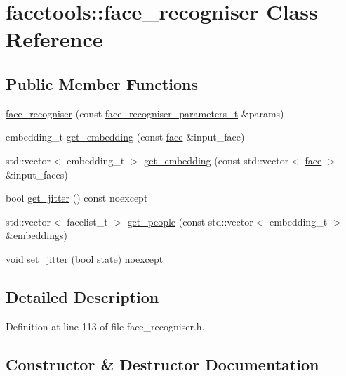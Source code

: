 \hypertarget{classfacetools_1_1face__recogniser}{}\section{facetools\+:\+:face\+\_\+recogniser Class Reference}
\label{classfacetools_1_1face__recogniser}
\subsection*{Public Member Functions}
\begin{DoxyCompactItemize}
\item 
\hyperlink{classfacetools_1_1face__recogniser_a4b091ff0164321ddadad92dd082c6639}{face\+\_\+recogniser} (const \hyperlink{structfacetools_1_1face__recogniser__parameters__t}{face\+\_\+recogniser\+\_\+parameters\+\_\+t} \&params)
\item 
embedding\+\_\+t \hyperlink{classfacetools_1_1face__recogniser_a9774f8e19f5ae4808efcc39cecc7ceb2}{get\+\_\+embedding} (const \hyperlink{structfacetools_1_1face}{face} \&input\+\_\+face)
\item 
std\+::vector$<$ embedding\+\_\+t $>$ \hyperlink{classfacetools_1_1face__recogniser_a8067f4dd21f3ae2930a2d552721f1d32}{get\+\_\+embedding} (const std\+::vector$<$ \hyperlink{structfacetools_1_1face}{face} $>$ \&input\+\_\+faces)
\item 
bool \hyperlink{classfacetools_1_1face__recogniser_a45ac64d931a2e2ef0a07c2934b24fe61}{get\+\_\+jitter} () const noexcept
\item 
std\+::vector$<$ facelist\+\_\+t $>$ \hyperlink{classfacetools_1_1face__recogniser_abf22c3198b60c504e1ba55764a2ea39b}{get\+\_\+people} (const std\+::vector$<$ embedding\+\_\+t $>$ \&embeddings)
\item 
void \hyperlink{classfacetools_1_1face__recogniser_aeef55331efaf5c414441d73aec86c838}{set\+\_\+jitter} (bool state) noexcept
\end{DoxyCompactItemize}


\subsection{Detailed Description}


Definition at line 113 of file face\+\_\+recogniser.\+h.



\subsection{Constructor \& Destructor Documentation}
